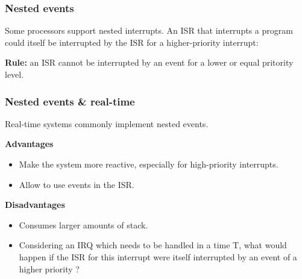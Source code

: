 %
%
%

\begin{frame}
  \frametitle{Nested events}

  Some processors support nested interrupts. An ISR that interrupts a program
  could itself be interrupted by the ISR for a higher-priority interrupt:
  \begin{center}
  \end{center}

  \-

  {\bf Rule:} an ISR cannot be interrupted by an event for a lower or equal
  pritority level.

\end{frame}

%
%
%

\begin{frame}
  \frametitle{Nested events \& real-time}

  Real-time systems commonly implement nested events.

  \-

  {\bf Advantages}

  \begin{itemize}
    \item Make the system more reactive, especially for high-priority
      interrupts.
    \item Allow to use events in the ISR.
  \end{itemize}

  \-

  {\bf Disadvantages}

  \begin{itemize}
    \item Consumes larger amounts of stack.
    \item Considering an IRQ which needs to be handled in a time T, what
      would happen if the ISR for this interrupt were itself interrupted by an
      event of a higher priority ?
  \end{itemize}

\end{frame}
